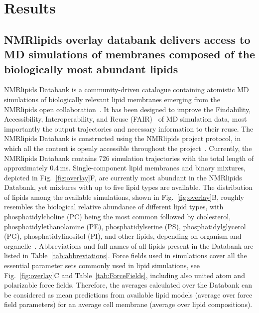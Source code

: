 \documentclass[fleqn,10pt]{wlscirep}
\begin{document}
\section{Results}

\subsection{NMRlipids overlay databank delivers access to MD simulations of membranes composed of the biologically most abundant lipids}

NMRlipids Databank is a community-driven catalogue containing atomistic MD simulations of biologically relevant lipid membranes emerging from the NMRlipids open collaboration~\cite{botan15,ollila16,catte16,antila19,bacle21}. It has been designed to improve the Findability, Accessibility, Interoperability, and Reuse (FAIR)~\cite{wilkinson16} of MD simulation data, most importantly the output trajectories and necessary information to their reuse. The NMRlipids Databank is constructed using the NMRlipids project protocol, in which all the content is openly accessible throughout the project~\cite{botan15}. Currently, the NMRlipids Databank contains 726 simulation trajectories with the total length of approximately 0.4\,ms. Single-component lipid membranes and binary mixtures, depicted in Fig.~\ref{fig:overlay}F, are currently most abundant in the NMRlipids Databank, yet mixtures with up to five lipid types are available. The distribution of lipids among the available simulations, shown in Fig.~\ref{fig:overlay}B, roughly resembles the biological relative abundance of different lipid types, with phosphatidylcholine (PC) being the most common followed by cholesterol, phosphatidylethanolamine (PE), phosphatidylserine (PS), phosphatidylglycerol (PG), phosphatidylinositol (PI), and other lipids, depending on organism and organelle~\cite{vanmeer08}. Abbreviations and full names of all lipids present in the Databank are listed in Table~\ref{tab:abbreviations}. Force fields used in simulations cover all the essential parameter sets commonly used in lipid simulations, see Fig.~\ref{fig:overlay}C and Table~\ref{tab:ForceFields}, including also united atom and polarizable force fields. Therefore, the averages calculated over the Databank can be considered as mean predictions from available lipid models (average over force field parameters) for an average cell membrane (average over lipid compositions).
\end{document}

